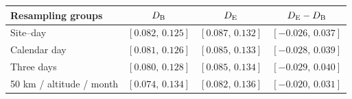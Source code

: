 \begin{tabular}{@{}lccc@{}}
\toprule
Resampling groups & $D_{\rm B}$ & $D_{\rm E}$ & $D_{\rm E}-D_{\rm B}$ \\
\midrule
Site--day & $[0.082,\,0.125]$ & $[0.087,\,0.132]$ & $[-0.026,\,0.037]$ \\
Calendar day & $[0.081,\,0.126]$ & $[0.085,\,0.133]$ & $[-0.028,\,0.039]$ \\
Three days & $[0.080,\,0.128]$ & $[0.085,\,0.134]$ & $[-0.029,\,0.040]$ \\
50 km / altitude / month & $[0.074,\,0.134]$ & $[0.082,\,0.136]$ & $[-0.020,\,0.031]$ \\
\bottomrule
\end{tabular}
